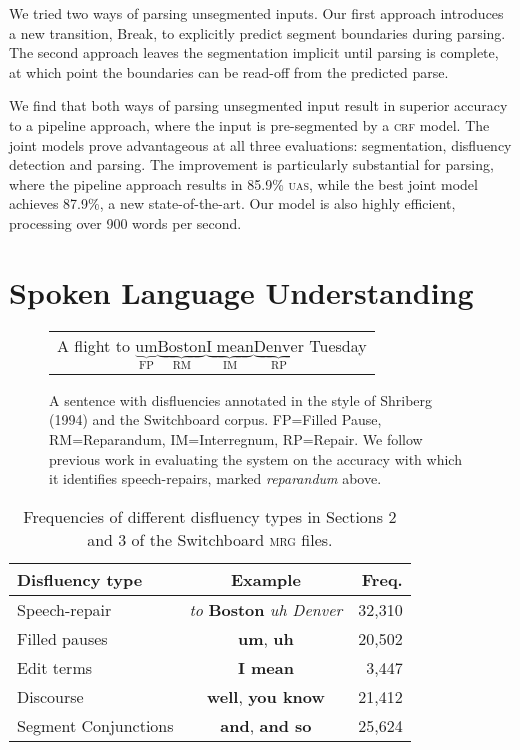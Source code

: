 \documentclass[11pt,letterpaper]{article}
\begin{document}
We tried two ways of parsing unsegmented inputs.  Our first approach introduces
a new transition, Break, to explicitly predict segment boundaries during parsing.
The second approach leaves the segmentation implicit until
parsing is complete, at which point the boundaries can be read-off from the
predicted parse.

We find that both ways of parsing unsegmented input result in superior accuracy
to a pipeline approach, where the input is pre-segmented by a \textsc{crf} model.
The joint models prove advantageous at all three evaluations: segmentation,
disfluency detection and parsing.
The improvement is particularly substantial for parsing, where the
pipeline approach results in 85.9\% \textsc{uas}, while the best joint model
achieves 87.9\%, a new state-of-the-art.  
Our model is also highly efficient, processing over 900 words per second.


\section{Spoken Language Understanding}

\begin{figure}
    \begin{tabular}{l}

        A flight to $\underbrace{\mathrm{um}}_\text{FP} \underbrace{\mathrm{Boston}}_\text{RM} \underbrace{\mathrm{I\;mean}}_\text{IM} \underbrace{\mathrm{Denver}}_\text{RP}$ Tuesday\\

\end{tabular}
\caption{\small A sentence with disfluencies annotated in the style of Shriberg (1994) 
    and the Switchboard corpus.
FP=Filled Pause, RM=Reparandum, IM=Interregnum, RP=Repair.
We follow previous work in evaluating the system on the accuracy with which
it identifies speech-repairs, marked \emph{reparandum} above.
\label{fig:shriberg}}
\end{figure}

\begin{table}
    \centering
    \small
    \begin{tabular}{lc|r}
\hline
Disfluency type & Example & Freq. \\
\hline \hline
Speech-repair & \emph{to } \textbf{Boston} \emph{uh Denver} & 32,310 \\
Filled pauses    & \textbf{um}, \textbf{uh} & 20,502 \\
Edit terms & \textbf{I mean} & 3,447 \\ 
Discourse  & \textbf{well}, \textbf{you know} & 21,412  \\
Segment Conjunctions & \textbf{and}, \textbf{and so} & 25,624 \\
\hline
\end{tabular}
\caption{\small Frequencies of different disfluency types in Sections 2 and 3 of the
Switchboard \textsc{mrg} files.\label{tab:dfl_freqs}}
\vspace*{-0.5in}
\end{table}
\end{document}
